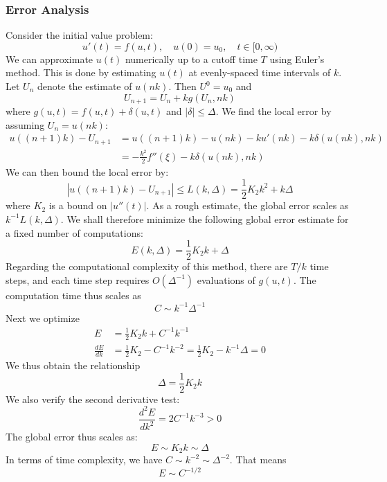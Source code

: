 \documentclass[letterpaper,11pt]{article}
\newcommand*{\deriv}[2]{\frac{d #1}{d #2}}
\newcommand*{\nderiv}[3]{\frac{d^{#3} #1}{d #2^{#3}}}
\newcommand*{\abs}[1]{\left| #1 \right|}
\begin{document}
\begin{flushleft}
    \subsubsection{Error Analysis}
    Consider the initial value problem:
    $$u'(t) = f(u, t), \quad u(0) = u_0, \quad t \in [0, \infty)$$
    We can approximate $u(t)$ numerically up to a cutoff time $T$ using Euler's method. This is done by estimating $u(t)$ at evenly-spaced time intervals of $k$. Let $U_n$ denote the estimate of $u(nk)$. Then $U^0 = u_0$ and
    $$U_{n+1} = U_n + kg(U_n, nk)$$
    where $g(u, t) = f(u, t) + \delta(u, t)$ and $|\delta| \leq \Delta$. We find the local error by assuming $U_n = u(nk)$:
    \begin{align*}
        u((n+1)k) - U_{n+1} &= u((n+1)k) - u(nk) - ku'(nk) - k\delta(u(nk), nk) \\
        &= -\frac{k^2}{2}f''(\xi) - k\delta(u(nk), nk)
    \end{align*}
    We can then bound the local error by:
    $$\abs{u((n+1)k) - U_{n+1}} \leq L(k, \Delta) = \frac{1}{2}K_2k^2 + k\Delta$$
    where $K_2$ is a bound on $\abs{u''(t)}$. As a rough estimate, the global error scales as $k^{-1}L(k, \Delta)$. We shall therefore minimize the following global error estimate for a fixed number of computations:
    $$E(k, \Delta) = \frac{1}{2}K_2k + \Delta$$
    Regarding the computational complexity of this method, there are $T/k$ time steps, and each time step requires $O(\Delta^{-1})$ evaluations of $g(u, t)$. The computation time thus scales as
    $$\boxed{C \sim k^{-1}\Delta^{-1}}$$
    Next we optimize
    \begin{align*}
        E &= \frac{1}{2}K_2k + C^{-1}k^{-1} \\
        \deriv{E}{k} &= \frac{1}{2}K_2 - C^{-1}k^{-2} = \frac{1}{2}K_2 - k^{-1}\Delta = 0
    \end{align*}
    We thus obtain the relationship
    $$\boxed{\Delta = \frac{1}{2}K_2k}$$
    We also verify the second derivative test:
    $$\nderiv{E}{k}{2} = 2C^{-1}k^{-3} > 0$$
    The global error thus scales as:
    $$\boxed{E \sim K_2 k \sim \Delta}$$
    In terms of time complexity, we have $C \sim k^{-2} \sim \Delta^{-2}$. That means
    $$\boxed{E \sim C^{-1/2}}$$

\end{flushleft}
\end{document}
